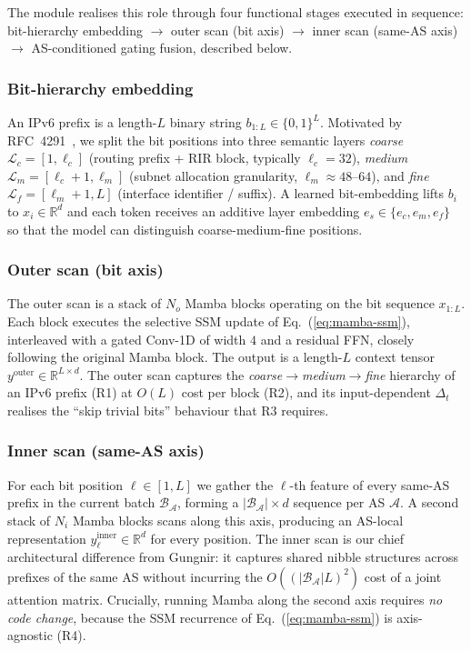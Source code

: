 \documentclass[conference]{IEEEtran}
\begin{document}
The module realises this role
through four functional stages executed in sequence:
bit-hierarchy embedding $\rightarrow$ outer scan (bit axis)
$\rightarrow$ inner scan (same-AS axis) $\rightarrow$
AS-conditioned gating fusion, described below.

\subsubsection{Bit-hierarchy embedding}An IPv6 prefix is a length-$L$ binary string
$b_{1:L}\!\in\!\{0,1\}^{L}$.  Motivated by
RFC~4291~\cite{hinden2006rfc4291}, we split the bit positions
into three semantic layers
\emph{coarse} $\mathcal{L}_c\!=\![1,\ell_c]$
(routing prefix + RIR block, typically $\ell_c\!=\!32$),
\emph{medium} $\mathcal{L}_m\!=\![\ell_c\!+\!1,\ell_m]$
(subnet allocation granularity, $\ell_m\!\approx\!48\text{--}64$),
and \emph{fine} $\mathcal{L}_f\!=\![\ell_m\!+\!1,L]$ (interface
identifier / suffix).  A learned bit-embedding lifts $b_i$ to
$x_i\!\in\!\mathbb{R}^{d}$ and each token receives an additive
layer embedding $e_s\!\in\!\{e_c,e_m,e_f\}$ so that the model
can distinguish coarse-medium-fine positions.

\subsubsection{Outer scan (bit axis)}
The outer scan is a stack of $N_o$ Mamba blocks operating on
the bit sequence $x_{1:L}$.  Each block executes the selective
SSM update of Eq.~(\ref{eq:mamba-ssm}), interleaved with a
gated Conv-1D of width $4$ and a residual FFN, closely
following the original Mamba block.  The output is a length-$L$
context tensor
$y^{\text{outer}}\!\in\!\mathbb{R}^{L\times d}$.  The outer
scan captures the
\emph{coarse$\rightarrow$medium$\rightarrow$fine} hierarchy of
an IPv6 prefix (R1) at $O(L)$ cost per block (R2), and its
input-dependent $\Delta_t$ realises the ``skip trivial bits''
behaviour that R3 requires.

\subsubsection{Inner scan (same-AS axis)}
For each bit position $\ell\!\in\![1,L]$ we gather the
$\ell$-th feature of every same-AS prefix in the current batch
$\mathcal{B}_{\mathcal{A}}$, forming a
$|\mathcal{B}_{\mathcal{A}}|\!\times\!d$ sequence per AS
$\mathcal{A}$.  A second stack of $N_i$ Mamba blocks scans
along this axis, producing an AS-local representation
$y^{\text{inner}}_{\ell}\!\in\!\mathbb{R}^{d}$ for every
position.  The inner scan is our chief architectural difference
from Gungnir: it captures shared nibble structures across
prefixes of the same AS without incurring the
$O((|\mathcal{B}_{\mathcal{A}}|L)^2)$ cost of a joint attention
matrix.  Crucially, running Mamba along the second axis
requires \emph{no code change}, because the SSM recurrence of
Eq.~(\ref{eq:mamba-ssm}) is axis-agnostic (R4).
\end{document}
